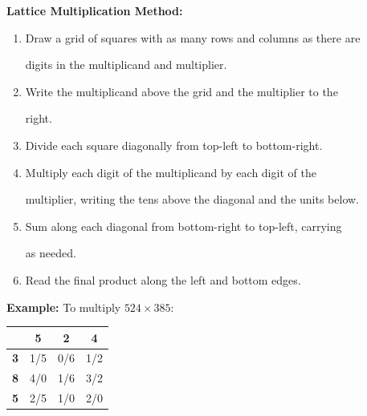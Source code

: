 \documentclass[11pt,a4paper]{article}
\newenvironment{mathalgo}{%

  \par\vspace{0.3cm}

  \begin{framed}

  \setlength{\parindent}{0pt}

}{%

  \end{framed}

  \par\vspace{0.3cm}

}
\begin{document}
\begin{mathalgo}

\textbf{Lattice Multiplication Method:}

\begin{enumerate}[nosep]

  \item Draw a grid of squares with as many rows and columns as there are

  digits in the multiplicand and multiplier.

  \item Write the multiplicand above the grid and the multiplier to the

  right.

  \item Divide each square diagonally from top-left to bottom-right.

  \item Multiply each digit of the multiplicand by each digit of the

  multiplier, writing the tens above the diagonal and the units below.

  \item Sum along each diagonal from bottom-right to top-left, carrying

  as needed.

  \item Read the final product along the left and bottom edges.

\end{enumerate}

\end{mathalgo}



\noindent\textbf{Example:} To multiply $524 \times 385$:



\begin{center}

\begin{tabular}{|c|c|c|c|}

\hline

& \textbf{5} & \textbf{2} & \textbf{4} \\

\hline

\textbf{3} & \multicolumn{1}{c|}{1/5} & \multicolumn{1}{c|}{0/6} & \multicolumn{1}{c|}{1/2} \\

\hline

\textbf{8} & \multicolumn{1}{c|}{4/0} & \multicolumn{1}{c|}{1/6} & \multicolumn{1}{c|}{3/2} \\

\hline

\textbf{5} & \multicolumn{1}{c|}{2/5} & \multicolumn{1}{c|}{1/0} & \multicolumn{1}{c|}{2/0} \\

\hline

\end{tabular}

\end{center}
\end{document}
